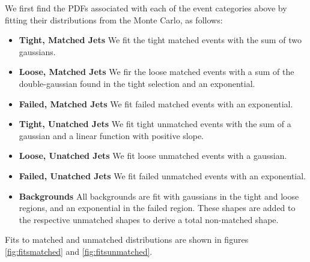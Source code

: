 We first find the PDFs associated with each of the event categories
above by fitting their distributions from the Monte Carlo, 
as follows:
\begin{itemize}
\item {\bf Tight, Matched Jets} We fit the tight matched events with the sum of two gaussians.
\item {\bf Loose, Matched Jets} We fir the loose matched events with a sum of the double-gaussian found in the tight selection and an exponential.
\item {\bf Failed, Matched Jets} We fit failed matched events with an exponential.
\item {\bf Tight, Unatched Jets} We fit tight unmatched events with the sum of a gaussian and a linear function with positive slope.
\item {\bf Loose, Unatched Jets} We fit loose unmatched events with a gaussian.
\item {\bf Failed, Unatched Jets} We fit failed unmatched events with an exponential.
\item {\bf Backgrounds} All backgrounds are fit with gaussians in the tight and loose regions, and an exponential in the failed region. These shapes are added to the respective unmatched shapes to derive a total non-matched shape.
\end{itemize}
Fits to matched and unmatched distributions are shown in figures \ref{fig:fitsmatched} and \ref{fig:fitsunmatched}.
